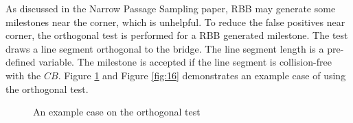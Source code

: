 \documentclass[12pt,draftcls,onecolumn]{IEEEtran}
\begin{document}
As discussed in the Narrow Passage Sampling paper, RBB may generate some milestones near the corner, which is unhelpful.
To reduce the false positives near corner, the orthogonal test is performed for a RBB generated milestone. 
The test draws a line segment orthogonal to the bridge.
The line segment length is a pre-defined variable.
The milestone is accepted if the line segment is collision-free with the $CB$.
 Figure \ref{fig:15} and  Figure \ref{fig:16} demonstrates an example case of using the orthogonal test.


\begin{figure}[htp]
  \centering
  \quad
  \quad
  \caption{An example case on the orthogonal test}
  \label{fig:15}
\end{figure}
\end{document}
